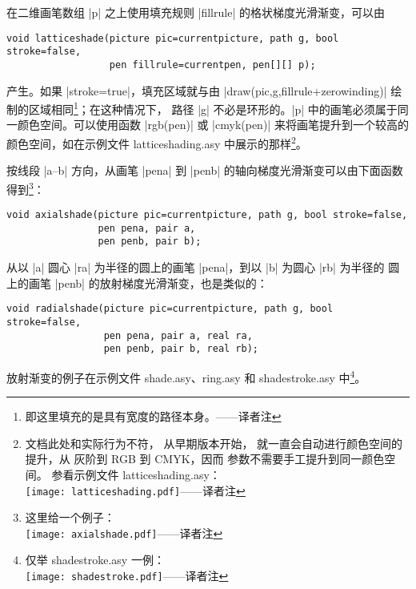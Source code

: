 \documentclass{ctexbook}
\newcommand*\prgname[1]{\textsf{#1}}
\newcommand\transnote[1]{\footnote{#1——译者注}}
\begin{document}
在二维画笔数组 |p| 之上使用填充规则 |fillrule| 的格状梯度光滑渐变，可以由
\begin{lstlisting}
void latticeshade(picture pic=currentpicture, path g, bool stroke=false,
                  pen fillrule=currentpen, pen[][] p);
\end{lstlisting}
产生。如果 |stroke=true|，填充区域就与由 |draw(pic,g,fillrule+zerowinding)|
绘制的区域相同\transnote{即这里填充的是具有宽度的路径本身。}；在这种情况下，
路径 |g| 不必是环形的。|p| 中的画笔必须属于同一颜色空间。可以使用函数
|rgb(pen)| 或 |cmyk(pen)| 来将画笔提升到一个较高的颜色空间，如在示例文件
\prgname{latticeshading.asy} 中展示的那样\transnote{文档此处和实际行为不符，
从早期版本开始， 就一直会自动进行颜色空间的提升，从
灰阶到 RGB 到 CMYK，因而 \inlinecode{p} 参数不需要手工提升到同一颜色空间。
参看示例文件 \prgname{latticeshading.asy}：\\
\setbox0\vbox{}%
\texttt{[image: latticeshading.pdf]}\box0}。

按线段 |a--b| 方向，从画笔 |pena| 到 |penb| 的轴向梯度光滑渐变可以由下面函数
得到\transnote{这里给一个例子：\\
\vbox{}%
\texttt{[image: axialshade.pdf]}\box0}：
\begin{lstlisting}
void axialshade(picture pic=currentpicture, path g, bool stroke=false,
                pen pena, pair a,
                pen penb, pair b);
\end{lstlisting}

从以 |a| 圆心 |ra| 为半径的圆上的画笔 |pena|，到以 |b| 为圆心 |rb| 为半径的
圆上的画笔 |penb| 的放射梯度光滑渐变，也是类似的：
\begin{lstlisting}
void radialshade(picture pic=currentpicture, path g, bool stroke=false,
                 pen pena, pair a, real ra,
                 pen penb, pair b, real rb);
\end{lstlisting}
放射渐变的例子在示例文件 \prgname{shade.asy}、\prgname{ring.asy} 和
\prgname{shadestroke.asy} 中\transnote{仅举 \prgname{shadestroke.asy}
一例：\\
\vbox{}%
\texttt{[image: shadestroke.pdf]}\box0}。
\end{document}
